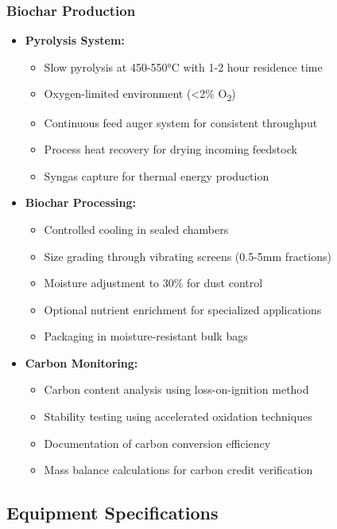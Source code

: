 \subsubsection{Biochar Production}
\begin{itemize}
    \item \textbf{Pyrolysis System:}
    \begin{itemize}
        \item Slow pyrolysis at 450-550°C with 1-2 hour residence time
        \item Oxygen-limited environment (<2\% O\textsubscript{2})
        \item Continuous feed auger system for consistent throughput
        \item Process heat recovery for drying incoming feedstock
        \item Syngas capture for thermal energy production
    \end{itemize}
    
    \item \textbf{Biochar Processing:}
    \begin{itemize}
        \item Controlled cooling in sealed chambers
        \item Size grading through vibrating screens (0.5-5mm fractions)
        \item Moisture adjustment to 30\% for dust control
        \item Optional nutrient enrichment for specialized applications
        \item Packaging in moisture-resistant bulk bags
    \end{itemize}
    
    \item \textbf{Carbon Monitoring:}
    \begin{itemize}
        \item Carbon content analysis using loss-on-ignition method
        \item Stability testing using accelerated oxidation techniques
        \item Documentation of carbon conversion efficiency
        \item Mass balance calculations for carbon credit verification
    \end{itemize}
\end{itemize}

\subsection{Equipment Specifications}

